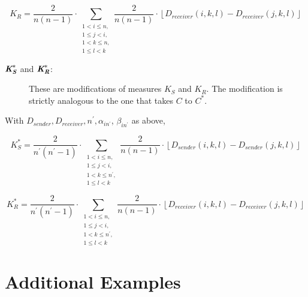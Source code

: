 \documentclass{article}
\def\mathbi#1{\textbf{\em #1}} %
\begin{document}
\[K_{R} = \frac{2}{n(n-1)}\cdot \sum\limits_{\substack{1 < i \leq n, \\ 1 \leq j < i, \\ 1 < k \leq n, \\ 1 \leq l < k}} \frac{2}{n(n-1)}\cdot\left\lfloor D_{receiver}(i, k, l) - D_{receiver}(j,k,l)\right\rfloor\]

\begin{description}
    \item[$\mathbi{K}^*_\mathbi{S}$ and $\mathbi{K}^*_\mathbi{R}$:]
These are modifications of measures $K_S$ and $K_R$. The modification is strictly analogous to the one that takes $C$ to $C^*$.

\end{description}

With $D_{sender}, D_{receiver}, n^\prime, \alpha_{in^\prime}$, $\beta_{in^\prime}$ as above,

\[K^{*}_{S} = \frac{2}{n^\prime(n^\prime-1)}\cdot \sum\limits_{\substack{1 < i \leq n, \\ 1 \leq j < i, \\ 1 < k \leq n^\prime, \\ 1 \leq l < k}} \frac{2}{n(n-1)}\cdot\left\lfloor D_{sender}(i, k, l) - D_{sender}(j,k,l)\right\rfloor\]

\[K^{*}_{R} = \frac{2}{n^\prime(n^\prime-1)}\cdot \sum\limits_{\substack{1 < i \leq n, \\ 1 \leq j < i, \\ 1 < k \leq n^\prime, \\ 1 \leq l < k}} \frac{2}{n(n-1)}\cdot\left\lfloor D_{receiver}(i, k, l) - D_{receiver}(j,k,l)\right\rfloor\]


\section*{Additional Examples}
\end{document}
